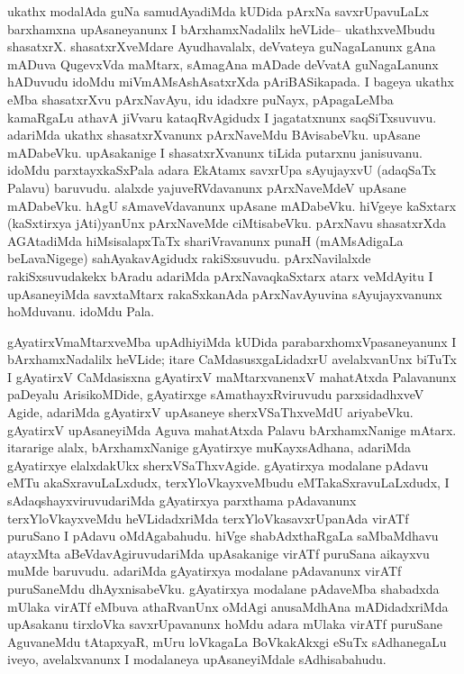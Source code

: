 \begin{artha}
ukathx modalAda guNa samudAyadiMda kUDida pArxNa savxrUpavuLaLx barxhamxna upAsaneyanunx I bArxhamxNadalilx heVLide-- ukathxveMbudu shasatxrX. shasatxrXveMdare Ayudhavalalx, deVvateya guNagaLanunx gAna mADuva QugevxVda maMtarx, sAmagAna mADade deVvatA guNagaLanunx hADuvudu idoMdu miVmAMsAshAsatxrXda pAriBASikapada. I bageya ukathx eMba shasatxrXvu pArxNavAyu, idu idadxre puNayx, pApagaLeMba kamaRgaLu athavA jiVvaru kataqRvAgidudx I jagatatxnunx saqSiTxsuvuvu. adariMda ukathx shasatxrXvanunx pArxNaveMdu BAvisabeVku. upAsane mADabeVku. upAsakanige I shasatxrXvanunx tiLida putarxnu janisuvanu. idoMdu parxtayxkaSxPala adara EkAtamx savxrUpa sAyujayxvU (adaqSaTx Palavu) baruvudu. alalxde yajuveRVdavanunx pArxNaveMdeV upAsane mADabeVku. hAgU sAmaveVdavanunx upAsane mADabeVku. hiVgeye kaSxtarx (kaSxtirxya jAti)yanUnx pArxNaveMde ciMtisabeVku. pArxNavu shasatxrXda AGAtadiMda hiMsisalapxTaTx shariVravanunx punaH (mAMsAdigaLa beLavaNigege) sahAyakavAgidudx rakiSxsuvudu. pArxNavilalxde rakiSxsuvudakekx bAradu adariMda pArxNavaqkaSxtarx atarx veMdAyitu I upAsaneyiMda savxtaMtarx rakaSxkanAda pArxNavAyuvina sAyujayxvanunx hoMduvanu.  idoMdu Pala.
\end{artha}

\begin{artha}
gAyatirxVmaMtarxveMba upAdhiyiMda kUDida parabarxhomxVpasaneyanunx I bArxhamxNadalilx heVLide; itare CaMdasusxgaLidadxrU avelalxvanUnx biTuTx  I gAyatirxV CaMdasisxna gAyatirxV maMtarxvanenxV mahatAtxda Palavanunx paDeyalu ArisikoMDide, gAyatirxge sAmathayxRviruvudu parxsidadhxveV Agide, adariMda gAyatirxV upAsaneye sherxVSaThxveMdU ariyabeVku. gAyatirxV upAsaneyiMda Aguva mahatAtxda Palavu bArxhamxNanige mAtarx. itararige alalx, bArxhamxNanige gAyatirxye muKayxsAdhana, adariMda gAyatirxye elalxdakUkx sherxVSaThxvAgide. gAyatirxya modalane pAdavu eMTu akaSxravuLaLxdudx, terxYloVkayxveMbudu eMTakaSxravuLaLxdudx, I sAdaqshayxviruvudariMda gAyatirxya parxthama pAdavanunx terxYloVkayxveMdu heVLidadxriMda terxYloVkasavxrUpanAda virATf puruSano I pAdavu oMdAgabahudu. hiVge shabAdxthaRgaLa saMbaMdhavu atayxMta aBeVdavAgiruvudariMda upAsakanige virATf puruSana aikayxvu muMde baruvudu. adariMda gAyatirxya modalane pAdavanunx virATf puruSaneMdu dhAyxnisabeVku. gAyatirxya modalane pAdaveMba shabadxda mUlaka virATf eMbuva athaRvanUnx oMdAgi anusaMdhAna mADidadxriMda upAsakanu tirxloVka savxrUpavanunx hoMdu adara mUlaka virATf puruSane AguvaneMdu tAtapxyaR, mUru loVkagaLa BoVkakAkxgi eSuTx sAdhanegaLu iveyo, avelalxvanunx I modalaneya upAsaneyiMdale sAdhisabahudu.
\end{artha}

